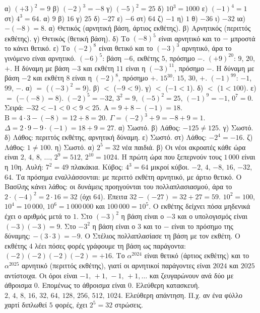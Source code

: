  α) $(+3)^2=9$ \quad β) $(-2)^3=-8$ \quad γ) $(-5)^2=25$ \quad δ) $10^3=1000$ \quad ε) $(-1)^4=1$ \quad στ) $4^3=64$.
 α) $9$ \quad β) $16$ \quad γ) $25$ \quad δ) $-27$ \quad ε) $-6$ \quad στ) $64$ \quad ζ) $-1$ \quad η) $1$ \quad θ) $-36$ \quad ι) $-32$ \quad ια) $-(-8)=8$.
 α) Θετικός (αρνητική βάση, άρτιος εκθέτης). β) Αρνητικός (περιττός εκθέτης). γ) Θετικός (θετική βάση). δ) Το $(-8)^5$ είναι αρνητικό και το $-$ μπροστά το κάνει θετικό. ε) Το $(-2)^8$ είναι θετικό και το $(-3)^3$ αρνητικό, άρα το γινόμενο είναι αρνητικό.
 $(-6)^5$: βάση $-6$, εκθέτης $5$, πρόσημο $-$. $(+9)^{20}$: $9$, $20$, $+$. Η δύναμη με βάση $-3$ και εκθέτη $11$ είναι η $(-3)^{11}$, πρόσημο $-$. Η δύναμη με βάση $-2$ και εκθέτη $8$ είναι η $(-2)^8$, πρόσημο $+$. $15^{30}$: $15$, $30$, $+$. $(-1)^{99}$: $-1$, $99$, $-$.
 α) $=$ ($(-3)^2=9$). β) $<$ ($-9<9$). γ) $<$ ($-1<1$). δ) $<$ ($1<100$). ε) $=$ ($-(-8)=8$).
 $(-2)^5=-32$, $3^2=9$, $(-5)^2=25$, $(-1)^9=-1$, $0^7=0$. Σειρά: $-32<-1<0<9<25$.
 $\mathrm{Α}=9+8-(-1)=18$. $\mathrm{Β}=4\cdot3-(-8)=12+8=20$. $\Gamma=(-2)^3+9=-8+9=1$. $\Delta=2\cdot9-9\cdot(-1)=18+9=27$.
 α) Σωστό. β) Λάθος: $-125\neq125$. γ) Σωστό. δ) Λάθος: περιττός εκθέτης, αρνητική δύναμη. ε) Σωστό. στ) Λάθος: $-2^4=-16$. ζ) Λάθος: $1\neq100$. η) Σωστό.
 α) $2^5=32$ νέα παιδιά. β) Οι νέοι ακροατές κάθε ώρα είναι $2,\,4,\,8,\,\dots,\,2^{9}=512,\,2^{10}=1024$. Η πρώτη ώρα που ξεπερνούν τους $1\,000$ είναι η $10$η.
 Αυλή: $7^2=49$ πλακάκια. Κύβος: $4^3=64$ μικροί κύβοι.
 $-2$, $4$, $-8$, $16$, $-32$, $64$. Τα πρόσημα εναλλάσσονται: με περιττό εκθέτη αρνητικό, με άρτιο θετικό.
 Ο Βασίλης κάνει λάθος: οι δυνάμεις προηγούνται του πολλαπλασιασμού, άρα το $2\cdot(-4)^2=2\cdot16=32$ (όχι $64$). Έπειτα $32-(-27)=32+27=59$.
 $10^2=100$, $10^4=10\,000$, $10^6=1\,000\,000$ και $100\,000=10^5$. Ο εκθέτης δείχνει πόσα μηδενικά έχει ο αριθμός μετά το $1$.
 Στο $(-3)^2$ η βάση είναι ο $-3$ και ο υπολογισμός είναι $(-3)(-3)=9$. Στο $-3^2$ η βάση είναι ο $3$ και το $-$ είναι το πρόσημο της δύναμης: $-(3\cdot3)=-9$.
 Ο Στέλιος πολλαπλασίασε τη βάση με τον εκθέτη. Ο εκθέτης $4$ λέει πόσες φορές γράφουμε τη βάση ως παράγοντα: $(-2)(-2)(-2)(-2)=+16$.
 Το $\alpha^{2024}$ είναι θετικό (άρτιος εκθέτης) και το $\alpha^{2025}$ αρνητικό (περιττός εκθέτης), γιατί οι αρνητικοί παράγοντες είναι $2024$ και $2025$ αντίστοιχα.
 Οι όροι είναι $-1,\,+1,\,-1,\,+1,\dots$ και ζευγαρώνουν ανά δύο με άθροισμα $0$. Επομένως το άθροισμα είναι $0$.
 Ελεύθερη κατασκευή. $2,\,4,\,8,\,16,\,32,\,64,\,128,\,256,\,512,\,1024$.
 Ελεύθερη απάντηση. Π.χ. αν ένα φύλλο χαρτί διπλωθεί $5$ φορές, έχει $2^5=32$ στρώσεις.
